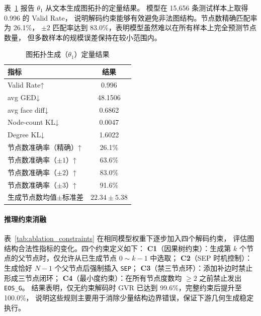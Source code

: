表~\ref{tab:main_results} 报告 $\theta_1$ 从文本生成图拓扑的定量结果。
模型在 15,656 条测试样本上取得 0.996 的 Valid Rate，
说明解码约束能够有效避免非法图结构。节点数精确匹配率为 26.1\%，
$\pm2$ 匹配率达到 83.0\%，表明模型虽然难以在所有样本上完全预测节点数量，
但多数样本的规模误差保持在较小范围内。

\begin{table}[h]
\centering
\caption{图拓扑生成（$\theta_1$）定量结果}
\label{tab:main_results}
\small
\begin{tabular}{lc}
\toprule
指标 & 结果 \\
\midrule
Valid Rate↑              & 0.996 \\
avg GED↓                 & 48.1506 \\
avg face diff↓           & 0.6862 \\
Node-count KL↓           & 0.0047  \\
Degree KL↓               & 1.6022  \\
节点数准确率（精确）↑     & 26.1\% \\
节点数准确率（$\pm1$）↑  & 63.6\% \\
节点数准确率（$\pm2$）↑  & 83.0\% \\
节点数准确率（$\pm3$）↑  & 91.6\% \\
生成节点数均值$\pm$标准差 & $22.34 \pm 5.38$ \\
\bottomrule
\end{tabular}
\end{table}

\paragraph{推理约束消融}
表~\ref{tab:ablation_constraints} 在相同模型权重下逐步加入四个解码约束，
评估图结构合法性指标的变化。四个约束定义如下：
\textbf{C1}（因果树约束）：生成第 $k$ 个节点的父节点时，仅允许从已生成节点
$0{\sim}k{-}1$ 中选取；
\textbf{C2}（SEP 时机控制）：生成恰好 $N-1$ 个父节点后强制插入 \texttt{SEP}；
\textbf{C3}（禁三节点环）：添加补边时禁止形成三节点闭环；
\textbf{C4}（最小度约束）：在所有节点度数均 $\geq 2$ 之前禁止发出 \texttt{EOS\_G}。
结果表明，仅无约束解码时 GVR 已达到 99.6\%，完整约束后提升至 100.0\%，
说明这些规则主要用于消除少量结构边界错误，保证下游几何生成稳定执行。

